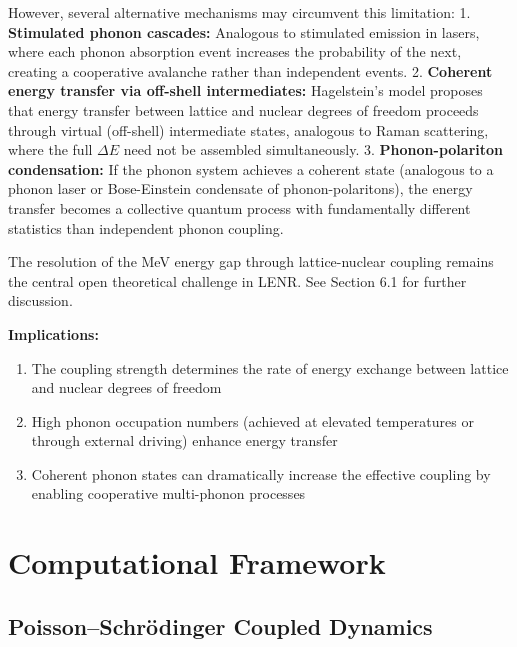\documentclass[11pt,a4paper]{article}
\begin{document}
However, several alternative mechanisms may circumvent this limitation: 1. \textbf{Stimulated phonon cascades:} Analogous to stimulated emission in lasers, where each phonon absorption event increases the probability of the next, creating a cooperative avalanche rather than independent events. 2. \textbf{Coherent energy transfer via off-shell intermediates:} Hagelstein's model proposes that energy transfer between lattice and nuclear degrees of freedom proceeds through virtual (off-shell) intermediate states, analogous to Raman scattering, where the full $\Delta E$ need not be assembled simultaneously. 3. \textbf{Phonon-polariton condensation:} If the phonon system achieves a coherent state (analogous to a phonon laser or Bose-Einstein condensate of phonon-polaritons), the energy transfer becomes a collective quantum process with fundamentally different statistics than independent phonon coupling.

The resolution of the MeV energy gap through lattice-nuclear coupling remains the central open theoretical challenge in LENR. See Section 6.1 for further discussion.

\textbf{Implications:}

\begin{enumerate}
\def\labelenumi{\arabic{enumi}.}
\item
  The coupling strength determines the rate of energy exchange between lattice and nuclear degrees of freedom
\item
  High phonon occupation numbers (achieved at elevated temperatures or through external driving) enhance energy transfer
\item
  Coherent phonon states can dramatically increase the effective coupling by enabling cooperative multi-phonon processes
\end{enumerate}

\section{Computational Framework}

\subsection{Poisson--Schr\"{o}dinger Coupled Dynamics}
\end{document}
